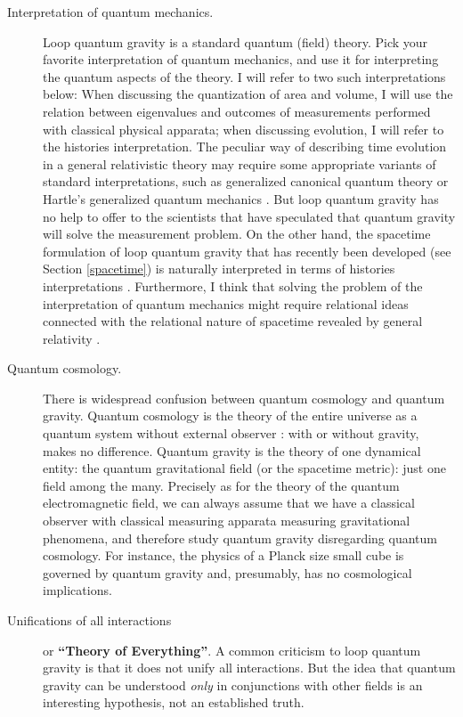 \documentclass[12pt]{article}
\begin{document}
\begin{description}
	\item[Interpretation of quantum mechanics.]  
	Loop quantum gravity is a standard quantum (field) theory.  
	Pick your favorite interpretation of quantum mechanics, and 
	use it for interpreting the quantum aspects of the theory.  I 
	will refer to two such interpretations below: When discussing 
	the quantization of area and volume, I will use the relation 
	between eigenvalues and outcomes of measurements performed 
	with classical physical apparata; when discussing evolution, I 
	will refer to the histories interpretation.  The peculiar way 
	of describing time evolution in a general relativistic theory 
	may require some appropriate variants of standard 
	interpretations, such as generalized canonical quantum theory 
	\cite{RovelliQM,RovelliTime,RovelliQM3} or Hartle's generalized 
	quantum mechanics \cite{Hartle}.  But loop quantum gravity has 
	no help to offer to the scientists that have speculated that 
	quantum gravity will solve the measurement problem.  On the 
	other hand, the spacetime formulation of loop quantum gravity 
	that has recently been developed (see Section \ref{spacetime}) 
	is naturally interpreted in terms of histories interpretations 
	\cite{Hartle,Isham,Isham2,Isham3,Isham4}.  Furthermore, I 
	think that solving the problem of the interpretation of 
	quantum mechanics might require relational ideas connected 
	with the relational nature of spacetime revealed by general 
	relativity \cite{RovelliQMint,RovelliHalf}.

	\item[Quantum cosmology.]  There is widespread confusion 
	between quantum cosmology and quantum gravity.  Quantum 
	cosmology is the theory of the entire universe as a quantum 
	system without external observer \cite{HartleQC}: with or 
	without gravity, makes no difference.  Quantum gravity is the 
	theory of one dynamical entity: the quantum gravitational 
	field (or the spacetime metric): just one field among the 
	many.  Precisely as for the theory of the quantum 
	electromagnetic field, we can always assume that we have a 
	classical observer with classical measuring apparata 
	measuring gravitational phenomena, and therefore study 
	quantum gravity disregarding quantum cosmology.  For 
	instance, the physics of a Planck size small cube is governed 
	by quantum gravity and, presumably, has no cosmological 
	implications.

	\item[Unifications of all interactions] or {\bf ``Theory of 
	Everything''}.  A common criticism to loop quantum gravity is 
	that it does not unify all interactions.  But the idea that 
	quantum gravity can be understood {\em only\/} in 
	conjunctions with other fields is an interesting hypothesis, 
	not an established truth.


\end{description}
\end{document}
